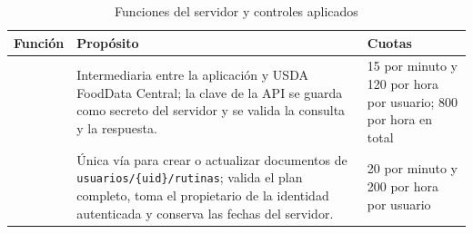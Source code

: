 \begin{table}[H]
\centering
\caption{Funciones del servidor y controles aplicados}
\label{tab:funciones-servidor}
\small
\begin{tabularx}{\textwidth}{|L{2.8cm}|Y|L{4.2cm}|}
\hline
{} \textbf{Función} & \textbf{Propósito} & \textbf{Cuotas} \\
\hline
{} & Intermediaria entre la aplicación y USDA FoodData
Central; la clave de la API se guarda como secreto del servidor y se valida la
consulta y la respuesta. & 15 por minuto y 120 por hora por usuario; 800 por
hora en total \\ \hline
{} & Única vía para crear o actualizar documentos de
\texttt{usuarios/\{uid\}/rutinas}; valida el plan completo, toma el propietario de
la identidad autenticada y conserva las fechas del servidor. & 20 por minuto y
200 por hora por usuario \\
\hline
\end{tabularx}
\end{table}
